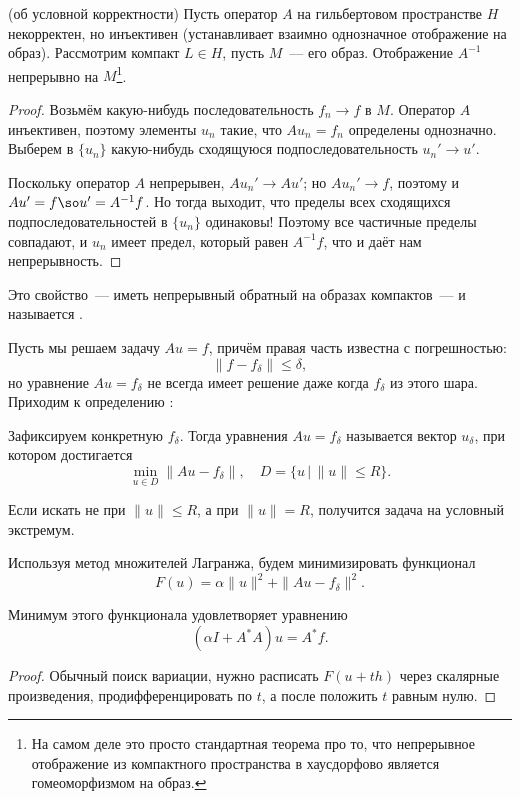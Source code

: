 \documentclass{trlnotes}
\begin{document}
    \begin{thm}(об условной корректности)
        Пусть оператор $A$ на гильбертовом пространстве $H$ некорректен, но инъективен (устанавливает взаимно однозначное отображение на образ). Рассмотрим компакт $L \in H$, пусть $M$~--- его образ. Отображение $A^{-1}$ непрерывно на $M$\footnote{На самом деле это просто стандартная теорема про то, что непрерывное отображение из компактного пространства в хаусдорфово является гомеоморфизмом на образ.}.
        \begin{proof}
            Возьмём какую-нибудь последовательность $f_n \to f$ в $M$. Оператор $A$ инъективен, поэтому элементы $u_n$ такие, что $Au_n = f_n$ определены однозначно. Выберем в $\{u_n\}$ какую-нибудь сходящуюся подпоследовательность $u_n' \to u'$. 

            Поскольку оператор $A$ непрерывен, $Au_n' \to Au'$; но $Au_n' \to f$, поэтому и $Au' = f \so u' = A^{-1}f$. Но тогда выходит, что пределы всех сходящихся подпоследовательностей в $\{u_n\}$ одинаковы! Поэтому все частичные пределы совпадают, и $u_n$ имеет предел, который равен $A^{-1}f$, что и даёт нам непрерывность. 
        \end{proof}
    \end{thm}

    \begin{de}
        Это свойство~--- иметь непрерывный обратный на образах компактов~--- и называется .
    \end{de}

    Пусть мы решаем задачу $Au = f$, причём правая часть известна с погрешностью:
    \[
        \|f - f_{\delta}\| \leqslant \delta,
    \]
    но уравнение $Au = f_{\delta}$ не всегда имеет решение даже когда $f_{\delta}$ из этого шара. Приходим к определению :

    \begin{de}
        Зафиксируем конкретную $f_{\delta}$. Тогда  уравнения $Au = f_{\delta}$ называется вектор $u_{\delta}$, при котором достигается 
        \[
            \min\limits_{u \in D} \|Au - f_{\delta}\|, \quad D = \big\{u \, \big| \, \|u\| \leqslant R\big\}.
        \]
    \end{de}
    
    Если искать не при $\|u\| \leqslant R$, а при $\|u\| = R$, получится задача на условный экстремум.

    Используя метод множителей Лагранжа, будем минимизировать функционал
    \[
        F(u) = \alpha \|u\|^2 + \|Au - f_{\delta}\|^2.
    \]
    \begin{st}
        Минимум этого функционала удовлетворяет уравнению
        \[
            (\alpha I + A^* A)u = A^* f.
        \]
        \begin{proof}
            Обычный поиск вариации, нужно расписать $F(u + th)$ через скалярные произведения, продифференцировать по $t$, а после положить $t$ равным нулю.
        \end{proof}
    \end{st}
\end{document}
